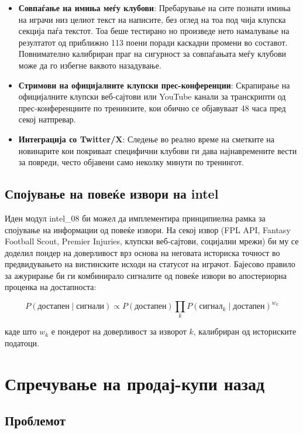 \begin{itemize}
  \item \textbf{Совпаѓање на имиња меѓу клубови}: Пребарување на сите познати имиња на играчи низ целиот текст на написите, без оглед на тоа под чија клупска секција паѓа текстот. Тоа беше тестирано но произведе нето намалување на резултатот од приближно 113 поени поради каскадни промени во составот. Повнимателно калибриран праг на сигурност за совпаѓањата меѓу клубови може да го избегне ваквото назадување.
  \item \textbf{Стримови на официјалните клупски прес-конференции}: Скрапирање на официјалните клупски веб-сајтови или YouTube канали за транскрипти од прес-конференциите по тренинзите, кои обично се објавуваат 48 часа пред секој натпревар.
  \item \textbf{Интеграција со Twitter/X}: Следење во реално време на сметките на новинарите кои покриваат специфични клубови ги дава најнавремените вести за повреди, често објавени само неколку минути по тренингот.
\end{itemize}

\subsection{Спојување на повеќе извори на intel}

Иден модул intel\_08 би можел да имплементира принципиелна рамка за спојување на информации од повеќе извори. На секој извор (FPL API, Fantasy Football Scout, Premier Injuries, клупски веб-сајтови, социјални мрежи) би му се доделил пондер на доверливост врз основа на неговата историска точност во предвидувањето на вистинските исходи на статусот на играчот. Бајесово правило за ажурирање би ги комбинирало сигналите од повеќе извори во апостериорна проценка на достапноста:

\begin{equation}
P(\text{достапен} \mid \text{сигнали}) \propto P(\text{достапен}) \prod_k P(\text{сигнал}_k \mid \text{достапен})^{w_k}
\end{equation}

каде што $w_k$ е пондерот на доверливост за изворот $k$, калибриран од историските податоци.

\section{Спречување на продај-купи назад}

\subsection{Проблемот}

